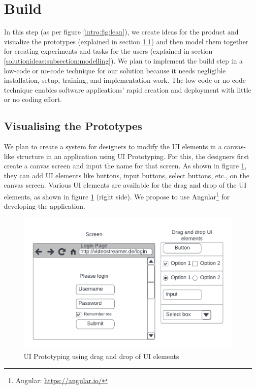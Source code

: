 \section{Build}
\label{solutionideas:section:build}
In this step (as per figure \ref{intro:fig:lean}), we create ideas for the product and visualize the prototypes (explained in section \ref{solutionideas:subsection:visualize}) and then model them together for creating experiments and tasks for the users (explained in section \ref{solutionideas:subsection:modelling}).
We plan to implement the build step in a low-code or no-code technique for our solution because it needs negligible installation, setup, training, and implementation work.
The low-code or no-code technique enables software applications' rapid creation and deployment with little or no coding effort.

\subsection{Visualising the Prototypes}
\label{solutionideas:subsection:visualize}

We plan to create a system for designers to modify the UI elements in a canvas-like structure in an application using UI Prototyping.
For this, the designers first create a canvas screen and input the name for that screen.
As shown in figure \ref{solutionideas:fig:uiprototyping}, they can add UI elements like buttons, input buttons, select buttons, etc., on the canvas screen.
Various UI elements are available for the drag and drop of the UI elements, as shown in figure \ref{solutionideas:fig:uiprototyping} (right side).
We propose to use Angular\footnote{Angular: \url{https://angular.io/}} for developing the application.

\begin{figure}[h]
    \centering
    \includegraphics[scale=0.4]{images/solution-ideas/UIPrototyping.png}
    \caption{UI Prototyping using drag and drop of UI elements}
    \label{solutionideas:fig:uiprototyping}
\end{figure}

